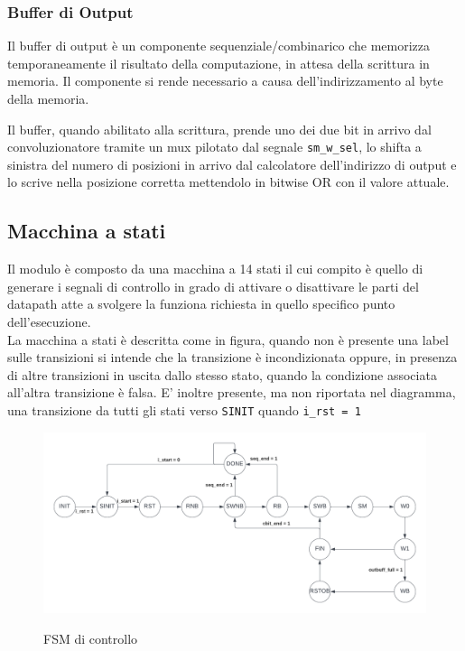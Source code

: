 \documentclass[12pt, a4paper]{article}
\begin{document}
\subsubsection{Buffer di Output}

Il buffer di output è un componente sequenziale/combinarico che memorizza temporaneamente il risultato della
computazione, in attesa della scrittura in memoria. 
Il componente si rende necessario a causa dell'indirizzamento al byte della memoria.

\pagebreak

Il buffer, quando abilitato alla scrittura, prende uno dei due bit in arrivo dal convoluzionatore tramite un mux 
pilotato dal segnale \texttt{sm\_w\_sel}, lo shifta a sinistra del numero di posizioni in arrivo
dal calcolatore dell'indirizzo di output e lo scrive nella posizione corretta 
mettendolo in bitwise OR con il valore attuale.


\subsection{Macchina a stati}

Il modulo è composto da una macchina a 14 stati il cui compito è quello di generare
i segnali di controllo in grado di attivare o disattivare le parti del datapath atte a
svolgere la funziona richiesta in quello specifico punto dell'esecuzione.\\

La macchina a stati è descritta come in figura, quando non è presente una label sulle transizioni
si intende che la transizione è incondizionata oppure, in presenza di altre transizioni
in uscita dallo stesso stato, quando la condizione associata all'altra transizione è falsa.
E' inoltre presente, ma non riportata nel diagramma, una transizione da tutti gli stati 
verso \texttt{SINIT} quando \texttt{i\_rst = 1}

\begin{figure}[!h]
    \centering
    \includegraphics[scale=0.3]{fsm_controllo.png}
    \label{fig:ctrl_fsm}
    \caption{FSM di controllo}
    
\end{figure}
\end{document}
